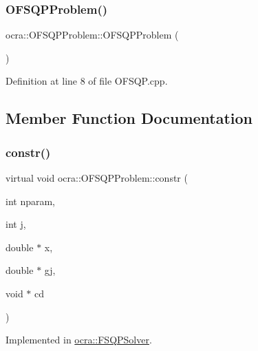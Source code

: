 \subsubsection{\texorpdfstring{O\+F\+S\+Q\+P\+Problem()}{OFSQPProblem()}}
{\footnotesize\ttfamily ocra\+::\+O\+F\+S\+Q\+P\+Problem\+::\+O\+F\+S\+Q\+P\+Problem (\begin{DoxyParamCaption}{ }\end{DoxyParamCaption})}



Definition at line 8 of file O\+F\+S\+Q\+P.\+cpp.



\subsection{Member Function Documentation}
\hypertarget{classocra_1_1OFSQPProblem_a2049a97008ac6eaa306c3cb05ef7d394}{}\label{classocra_1_1OFSQPProblem_a2049a97008ac6eaa306c3cb05ef7d394} 
\subsubsection{\texorpdfstring{constr()}{constr()}}
{\footnotesize\ttfamily virtual void ocra\+::\+O\+F\+S\+Q\+P\+Problem\+::constr (\begin{DoxyParamCaption}\item[{int}]{nparam,  }\item[{int}]{j,  }\item[{double $\ast$}]{x,  }\item[{double $\ast$}]{gj,  }\item[{void $\ast$}]{cd }\end{DoxyParamCaption})\hspace{0.3cm}{\ttfamily [pure virtual]}}



Implemented in \hyperlink{classocra_1_1FSQPSolver_ae989c0c32f87ea5e4e5a85e11683fcff}{ocra\+::\+F\+S\+Q\+P\+Solver}.

\hypertarget{classocra_1_1OFSQPProblem_ab89eefbaf9b86a89a0ceede0b4b61284}{}\label{classocra_1_1OFSQPProblem_ab89eefbaf9b86a89a0ceede0b4b61284} 
